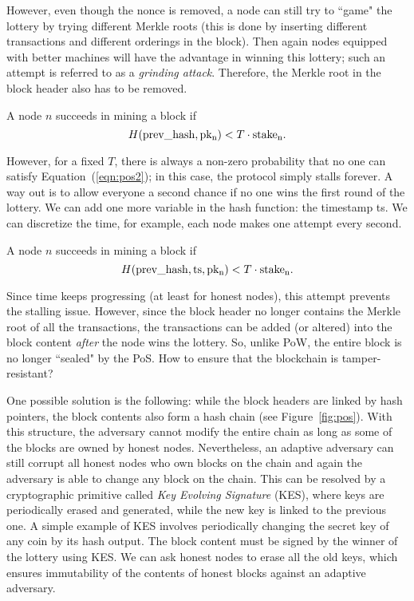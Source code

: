 \documentclass{article}
\begin{document}
However, even though the {\sf nonce} is removed, a node can still try to ``game" the lottery by trying different Merkle roots (this is done by inserting different  transactions and different orderings in the block). Then again nodes equipped with better machines will have the advantage in winning this lottery; such an attempt is referred to as a {\em grinding attack}.  Therefore, the Merkle root in the block header also has to be removed.

 A node $n$ succeeds in mining a block if
\begin{equation}
    \label{eqn:pos2}
    H{\rm (prev\_hash,pk_n)} < T\cdot{\rm stake_n}.
\end{equation}

However, for a fixed $T$, there is always a non-zero probability that no one can satisfy Equation~(\ref{eqn:pos2}); in this case, the protocol simply stalls forever. A way out is to allow everyone a second chance if no one wins the first round of the lottery. We can add one more variable in the hash function: the timestamp {\sf ts}. We can discretize the time, for example, each node makes one attempt every second. 

 A node $n$ succeeds in mining a block if
\begin{equation}
    \label{eqn:pos3}
    H{\rm (prev\_hash,ts,pk_n)} < T\cdot{\rm stake_n}.
\end{equation}

Since time keeps progressing (at least for honest nodes), this attempt prevents the stalling issue. However, since the block header no longer contains the Merkle root of all the transactions, the transactions can be added (or altered) into the block content {\em after} the node wins the lottery. So, unlike PoW, the entire block is no longer ``sealed" by the PoS. How to ensure that the blockchain is tamper-resistant? 

One possible solution is the following: while the block headers are linked by hash pointers, the block contents also form a hash chain (see Figure~\ref{fig:pos}). With this structure, the adversary cannot modify the entire chain as long as some of the blocks are owned by honest nodes. Nevertheless, an adaptive adversary can still corrupt all honest nodes who own blocks on the chain and again the adversary is able to change any block on the chain. This can be resolved by a cryptographic primitive called {\it Key Evolving Signature} (KES), where keys are periodically erased and generated, while the new key is linked to the previous one. A simple example of KES involves periodically changing the secret key of any coin by its hash output. The block content must be signed by the winner of the lottery using KES. We can ask honest nodes to erase all the old keys, which ensures immutability of the contents of honest blocks against an adaptive adversary.
\end{document}
